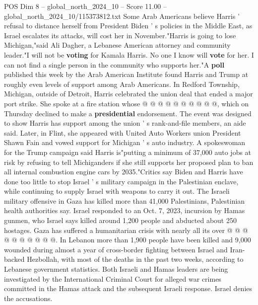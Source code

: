 \begin{textsample}{POS Dim 8 – global\_north\_2024\_10 – Score 11.00 – global\_north\_2024\_10/115373812.txt}
Some Arab Americans believe Harris ' refusal to distance herself from President Biden ' s policies in the Middle East, as Israel escalates its attacks, will cost her in November."Harris is going to lose Michigan,"said Ali Dagher, a Lebanese American attorney and community leader."I will not be \textbf{voting} for Kamala Harris.
No one I know will \textbf{vote} for her.
I can not find a single person in the community who supports her."A \textbf{poll} published this week by the Arab American Institute found Harris and Trump at roughly even levels of support among Arab Americans.
In Redford Township, Michigan, outside of Detroit, Harris celebrated the union deal that ended a major port strike.
She spoke at a fire station whose @ @ @ @ @ @ @ @ @ @, which on Thursday declined to make a \textbf{presidential} endorsement.
The event was designed to show Harris has support among the union ' s rank-and-file members, an aide said.
Later, in Flint, she appeared with United Auto Workers union President Shawn Fain and vowed support for Michigan ' s auto industry.
A spokeswoman for the Trump campaign said Harris is"putting a minimum of 37,000 auto jobs at risk by refusing to tell Michiganders if she still supports her proposed plan to ban all internal combustion engine cars by 2035."Critics say Biden and Harris have done too little to stop Israel ' s military campaign in the Palestinian enclave, while continuing to supply Israel with weapons to carry it out.
The Israeli military offensive in Gaza has killed more than 41,000 Palestinians, Palestinian health authorities say.
Israel responded to an Oct. 7, 2023, incursion by Hamas gunmen, who Israel says killed around 1,200 people and abducted about 250 hostages.
Gaza has suffered a humanitarian crisis with nearly all its over @ @ @ @ @ @ @ @ @ @.
In Lebanon more than 1,900 people have been killed and 9,000 wounded during almost a year of cross-border fighting between Israel and Iran-backed Hezbollah, with most of the deaths in the past two weeks, according to Lebanese government statistics.
Both Israeli and Hamas leaders are being investigated by the International Criminal Court for alleged war crimes committed in the Hamas attack and the subsequent Israeli response.
Israel denies the accusations.

\end{textsample}
